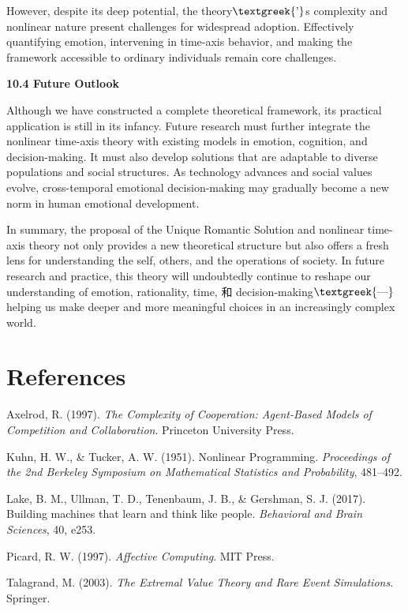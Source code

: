 \documentclass[a4paper]{article}
\begin{document}
However, despite its deep potential, the theory$\text{\textgreek{’}}$s complexity and nonlinear nature present
challenges for widespread adoption. Effectively quantifying emotion, intervening in time-axis behavior, and making the
framework accessible to ordinary individuals remain core challenges.

\textbf{10.4 Future Outlook}

Although we have constructed a complete theoretical framework, its practical application is still in its infancy. Future
research must further integrate the nonlinear time-axis theory with existing models in emotion, cognition, and
decision-making. It must also develop solutions that are adaptable to diverse populations and social structures. As
technology advances and social values evolve, cross-temporal emotional decision-making may gradually become a new norm
in human emotional development.

In summary, the proposal of the Unique Romantic Solution and nonlinear time-axis theory not only provides a new
theoretical structure but also offers a fresh lens for understanding the self, others, and the operations of society.
In future research and practice, this theory will undoubtedly continue to reshape our understanding of emotion,
rationality, time, 和 decision-making$\text{\textgreek{—}}$helping us make deeper and more meaningful choices in an
increasingly complex world.


\bigskip


\bigskip


\bigskip


\bigskip

\clearpage\section{References}
Axelrod, R. (1997). \textit{The Complexity of Cooperation: Agent-Based Models of Competition and Collaboration}.
Princeton University Press.

Kuhn, H. W., \& Tucker, A. W. (1951). Nonlinear Programming. \textit{Proceedings of the 2nd Berkeley Symposium on
Mathematical Statistics and Probability}, 481–492.

Lake, B. M., Ullman, T. D., Tenenbaum, J. B., \& Gershman, S. J. (2017). Building machines that learn and think like
people. \textit{Behavioral and Brain Sciences}, 40, e253.

Picard, R. W. (1997). \textit{Affective Computing}. MIT Press.

Talagrand, M. (2003). \textit{The Extremal Value Theory and Rare Event Simulations}. Springer.
\end{document}
